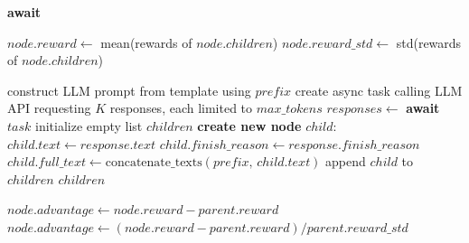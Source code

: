 \begin{algorithm}[htbp]
\begin{algorithmic}[1]
      \State \textbf{await} 

      \State $node.reward \leftarrow$ mean(rewards of $node.children$)
      \State $node.reward\_std \leftarrow$ std(rewards of $node.children$)
    \EndProcedure

      \State construct LLM prompt from template using $prefix$
      \State create async task calling LLM API requesting $K$ responses, each limited to $max\_tokens$
      \State $responses \leftarrow$ \textbf{await} $task$
      \State initialize empty list $children$
        \State \textbf{create new node} $child$:
          \State\hspace{\algorithmicindent} $child.text \leftarrow response.text$
          \State\hspace{\algorithmicindent} $child.finish\_reason \leftarrow response.finish\_reason$
          \State\hspace{\algorithmicindent} $child.full\_text \leftarrow \text{concatenate\_texts}(prefix,\,child.text)$
        \State append $child$ to $children$
      \EndFor
      \State \Return $children$
    \EndProcedure

    
              \State $node.advantage \leftarrow node.reward - parent.reward$
               \State $node.advantage \leftarrow (node.reward - parent.reward)/parent.reward\_std$
          \EndIf
      \EndIf
    \EndProcedure

  \end{algorithmic}
\end{algorithm}